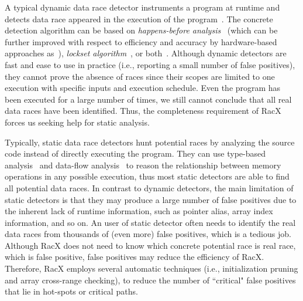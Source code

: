 \documentclass[10pt,onecolumn,letterpaper]{article}
\begin{document}
A typical dynamic data race detector instruments a program at
runtime and detects data race appeared in the execution of the
program~\cite{Erickson10OSDI}. The concrete detection algorithm can
be based on \emph{happens-before
analysis}~\cite{Lamport78CACM,Choi91TPOLS} (which can be further
improved with respect to efficiency and accuracy by hardware-based
approaches as~\cite{Prvulovic06HPCA,Muzahid09ISCA,Lucia10ISCA}),
\emph{lockset algorithm}~\cite{Savage97TCS}, or
both~\cite{Callahan03PPoPP}. Although dynamic detectors are fast and
ease to use in practice (i.e., reporting a small number of false
positives), they cannot prove the absence of races since their
scopes are limited to one execution with specific inputs and
execution schedule. Even the program has been executed for a large
number of times, we still cannot conclude that all real data races
have been identified. Thus, the completeness requirement of RacX
forces us seeking help for static analysis.

Typically, static data race detectors hunt potential races by
analyzing the source code instead of directly executing the program.
They can use type-based
analysis~\cite{Flanagan00PLDI,Boyapati02OOSPLA,Pratikakis06PLDI} and
data-flow analysis~\cite{Engler03SOSP,Naik06PLDI,Voung07FSE} to
reason the relationship between memory operations in any possible
execution, thus most static detectors are able to find all potential
data races. In contrast to dynamic detectors, the main limitation of
static detectors is that they may produce a large number of false
positives due to the inherent lack of runtime information, such as
pointer alias, array index information, and so on. An user of static
detector often needs to identify the real data races from thousands
of (even more) false positives, which is a tedious job. Although
RacX does not need to know which concrete potential race is real
race, which is false positive, false positives may reduce the
efficiency of RacX. Therefore, RacX employs several automatic
techniques (i.e., initialization pruning and array cross-range
checking), to reduce the number of ``critical" false positives that
lie in hot-spots or critical paths.
\end{document}
